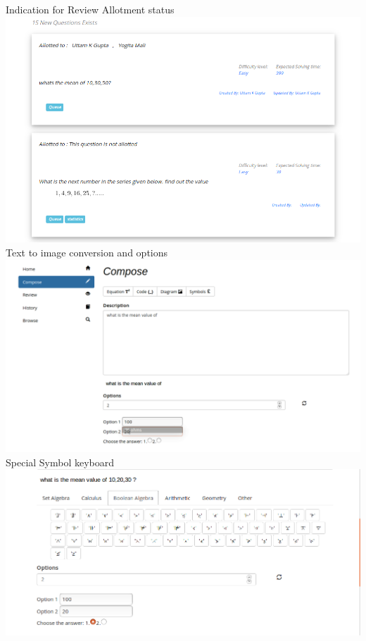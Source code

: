 \documentclass[a4paper,12pt,oneside]{book}
\begin{document}
\vspace{2in}
Indication for Review Allotment status \\
\includegraphics[scale=0.45]{allotedreview.png}	\\

\vspace{1in}
\newpage Text to image conversion and options\\
\includegraphics[scale=0.3]{compose.png}	\\

\vspace{2in}
Special Symbol keyboard\\
\includegraphics[scale=0.4]{compose4.png}	\\
\end{document}
